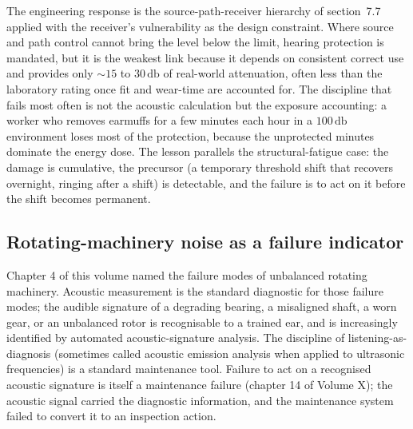 The engineering response is the source-path-receiver hierarchy of
section~7.7 applied with the receiver's vulnerability as the design
constraint. Where source and path control cannot bring the level below
the limit, hearing protection is mandated, but it is the weakest link
because it depends on consistent correct use and provides only
$\sim 15$ to $30\,\si{\decibel}$ of real-world attenuation, often less
than the laboratory rating once fit and wear-time are accounted for.
The discipline that fails most often is not the acoustic calculation
but the exposure accounting: a worker who removes earmuffs for a few
minutes each hour in a $100\,\si{\decibel}$ environment loses most of
the protection, because the unprotected minutes dominate the energy
dose. The lesson parallels the structural-fatigue case: the damage is
cumulative, the precursor (a temporary threshold shift that recovers
overnight, ringing after a shift) is detectable, and the failure is to
act on it before the shift becomes permanent.

\subsection{Rotating-machinery noise as a failure indicator}

Chapter 4 of this volume named the failure modes of unbalanced
rotating machinery. Acoustic measurement is the standard diagnostic
for those failure modes; the audible signature of a degrading
bearing, a misaligned shaft, a worn gear, or an unbalanced rotor is
recognisable to a trained ear, and is increasingly identified by
automated acoustic-signature analysis. The discipline of
listening-as-diagnosis (sometimes called acoustic emission
analysis when applied to ultrasonic frequencies) is a standard
maintenance tool. Failure to act on a recognised acoustic signature
is itself a maintenance failure (chapter 14 of Volume X); the
acoustic signal carried the diagnostic information, and the
maintenance system failed to convert it to an inspection action.

